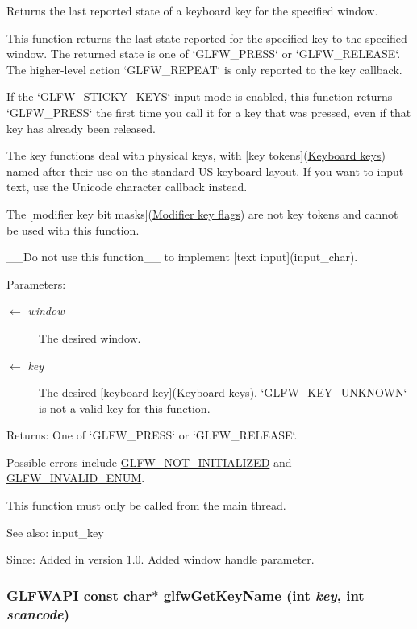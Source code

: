 Returns the last reported state of a keyboard key for the specified window. 

This function returns the last state reported for the specified key to the specified window. The returned state is one of `GLFW\_\-PRESS` or `GLFW\_\-RELEASE`. The higher-level action `GLFW\_\-REPEAT` is only reported to the key callback.

If the `GLFW\_\-STICKY\_\-KEYS` input mode is enabled, this function returns `GLFW\_\-PRESS` the first time you call it for a key that was pressed, even if that key has already been released.

The key functions deal with physical keys, with \mbox{[}key tokens\mbox{]}(\hyperlink{group__keys}{Keyboard keys}) named after their use on the standard US keyboard layout. If you want to input text, use the Unicode character callback instead.

The \mbox{[}modifier key bit masks\mbox{]}(\hyperlink{group__mods}{Modifier key flags}) are not key tokens and cannot be used with this function.

\_\-\_\-Do not use this function\_\-\_\- to implement \mbox{[}text input\mbox{]}(input\_\-char).

\begin{Desc}
\item[Parameters:]
\begin{description}
\item[\mbox{$\leftarrow$} {\em window}]The desired window. \item[\mbox{$\leftarrow$} {\em key}]The desired \mbox{[}keyboard key\mbox{]}(\hyperlink{group__keys}{Keyboard keys}). `GLFW\_\-KEY\_\-UNKNOWN` is not a valid key for this function. \end{description}
\end{Desc}
\begin{Desc}
\item[Returns:]One of `GLFW\_\-PRESS` or `GLFW\_\-RELEASE`.\end{Desc}
Possible errors include \hyperlink{group__errors_g2374ee02c177f12e1fa76ff3ed15e14a}{GLFW\_\-NOT\_\-INITIALIZED} and \hyperlink{group__errors_g76f6bb9c4eea73db675f096b404593ce}{GLFW\_\-INVALID\_\-ENUM}.

This function must only be called from the main thread.

\begin{Desc}
\item[See also:]input\_\-key\end{Desc}
\begin{Desc}
\item[Since:]Added in version 1.0.  Added window handle parameter. \end{Desc}
\hypertarget{group__input_g9323a397832dd03faa2a88534847c984}{
\subsubsection[glfwGetKeyName]{\setlength{\rightskip}{0pt plus 5cm}GLFWAPI const char$\ast$ glfwGetKeyName (int {\em key}, \/  int {\em scancode})}}
\label{group__input_g9323a397832dd03faa2a88534847c984}


